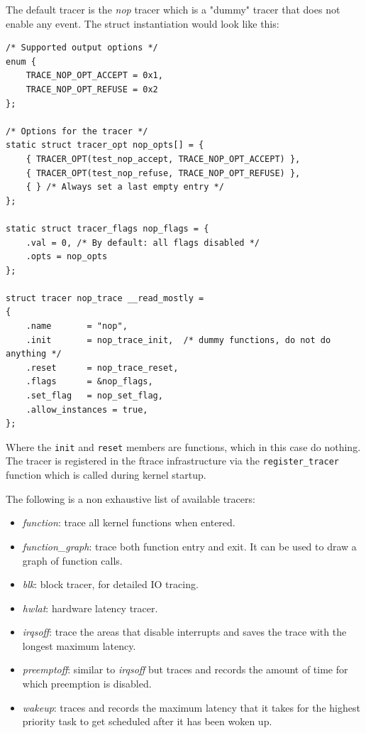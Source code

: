 The default tracer is the \textit{nop} tracer which is a "dummy" tracer that does
not enable any event. The struct instantiation would look like this:

\begin{verbatim}
/* Supported output options */
enum {
	TRACE_NOP_OPT_ACCEPT = 0x1,
	TRACE_NOP_OPT_REFUSE = 0x2
};

/* Options for the tracer */
static struct tracer_opt nop_opts[] = {
	{ TRACER_OPT(test_nop_accept, TRACE_NOP_OPT_ACCEPT) },
	{ TRACER_OPT(test_nop_refuse, TRACE_NOP_OPT_REFUSE) },
	{ } /* Always set a last empty entry */
};

static struct tracer_flags nop_flags = {
	.val = 0, /* By default: all flags disabled */
	.opts = nop_opts
};

struct tracer nop_trace __read_mostly =
{
	.name		= "nop",
	.init		= nop_trace_init,  /* dummy functions, do not do anything */
	.reset		= nop_trace_reset,
	.flags		= &nop_flags,
	.set_flag	= nop_set_flag,
	.allow_instances = true,
};
\end{verbatim}

Where the \verb|init| and \verb|reset| members are functions, which in this case
do nothing. The tracer is registered in the ftrace infrastructure via
the \verb|register_tracer| function which is called during kernel startup.

The following is a non exhaustive list of available tracers:

\begin{itemize}

\item \textit{function}: trace all kernel functions when entered.

\item \textit{function\_graph}: trace both function entry and exit. It can be
used to draw a graph of function calls.

\item \textit{blk}: block tracer, for detailed IO tracing.

\item \textit{hwlat}: hardware latency tracer.

\item \textit{irqsoff}: trace the areas that disable interrupts and saves the
trace with the longest maximum latency.

\item \textit{preemptoff}: similar to \textit{irqsoff} but traces and records
the amount of time for which preemption is disabled.

\item \textit{wakeup}: traces and records the maximum latency that it takes for
the highest priority task to get scheduled after it has been woken up.

\end{itemize}


